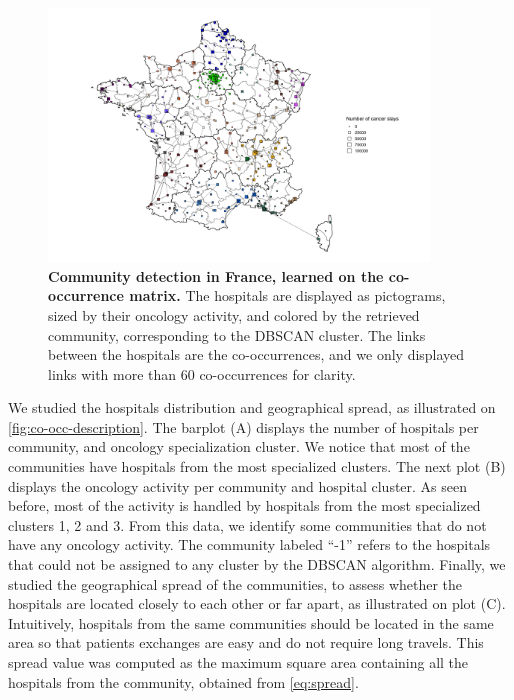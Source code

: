 \begin{figure}[h!]
    \includegraphics[width=0.9\textwidth]{images/co-occurrences/fig1.png}
    \centering
    \caption{ \textbf{Community detection in France, learned on the
            co-occurrence matrix.} The hospitals are displayed as
        pictograms, sized by their oncology activity, and colored by the retrieved
        community, corresponding to the DBSCAN cluster. The links between the hospitals
        are the co-occurrences, and we only displayed links with more than 60
        co-occurrences for clarity. }
    \label{fig:co-occ-france}
\end{figure}

We studied the hospitals distribution and geographical spread, as illustrated on
\cref{fig:co-occ-description}. The barplot (A) displays the number of hospitals
per community, and oncology specialization cluster. We notice that most of the
communities have hospitals from the most specialized clusters. The next plot (B)
displays the oncology activity per community and hospital cluster. As seen
before, most of the activity is handled by hospitals from the most specialized
clusters 1, 2 and 3. From this data, we identify some communities that do not
have any oncology activity. The community labeled ``-1'' refers to the hospitals
that could not be assigned to any cluster by the DBSCAN algorithm. Finally, we
studied the geographical spread of the communities, to assess whether the
hospitals are located closely to each other or far apart, as illustrated on plot
(C). Intuitively, hospitals from the same communities should be located in the
same area so that patients exchanges are easy and do not require long travels.
This spread value was computed as the maximum square area containing all the
hospitals from the community, obtained from \cref{eq:spread}.

